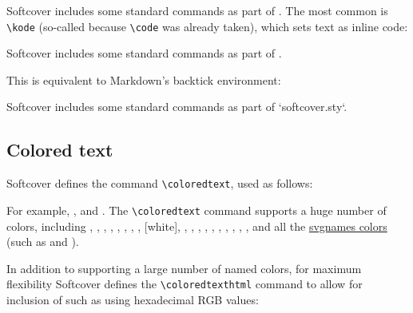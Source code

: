 Softcover includes some standard commands as part of . The most common is \verb+\kode+ (so-called because \verb+\code+ was already taken), which sets text as inline code:

\begin{code}
Softcover includes some standard commands as part of .
\end{code}

\noindent This is equivalent to Markdown's backtick environment:

\begin{code}
Softcover includes some standard commands as part of `softcover.sty`.
\end{code}

\subsection{Colored text} %
\label{sec:colored_text}

Softcover defines the command \verb+\coloredtext+, used as follows:

\begin{code}
\end{code}

\noindent For example, , and . The \verb+\coloredtext+ command supports a huge number of colors, including
,
,
,
,
,
,
,
,
 [white],
,
,
,
,
,
,
,
,
,
, and all the \href{http://www.latextemplates.com/svgnames-colors}{svgnames colors} (such as  and ).

In addition to supporting a large number of named colors, for maximum flexibility Softcover defines the \verb+\coloredtexthtml+ command to allow for inclusion of  such as  using hexadecimal RGB values:

